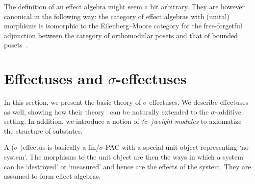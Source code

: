 \documentclass[%
	submission,
copyright,creativecommons,UKenglish]{eptcs}
\begin{document}
\begin{remark}
The definition of an effect algebra might seem a bit arbitrary.
They are however canonical in the following way:
    the category of effect algebras with (unital) morphisms
    is isomorphic to the Eilenberg--Moore category
    for the free-forgetful adjunction between the category of orthomodular posets
        and that of bounded posets~\cite{harding2004remarks,jenvca2015effect}.
\end{remark}

\section{Effectuses and \texorpdfstring{$\sigma$}{sigma}-effectuses}
\label{sec:effectus-sigma-effectus}

In this section, we present the basic theory of $\sigma$-effectuses.
We describe effectuses as well,
showing how their theory~\cite{cho2015introduction,jacobs2015new}
can be naturally extended to the $\sigma$-additive setting.
In addition, we introduce a notion of \emph{($\sigma$-)weight modules}
to axiomatize the structure of substates.


A ($\sigma$-)effectus is basically a fin/$\sigma$-PAC with a special
unit object representing `no system'. The morphisms to the unit object
are then the ways in which a system can be `destroyed' or `measured'
and hence are the effects of the system.
They are assumed to form effect algebras.
\end{document}
